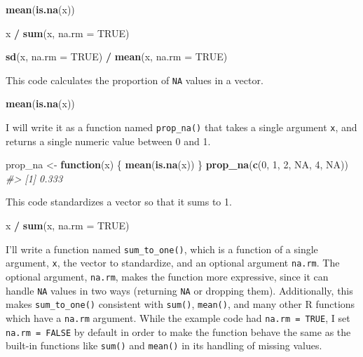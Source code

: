 \documentclass[]{book}
\newenvironment{Shaded}{\begin{snugshade}}{\end{snugshade}}
\newcommand{\CommentTok}[1]{\textcolor[rgb]{0.56,0.35,0.01}{\textit{#1}}}
\newcommand{\ControlFlowTok}[1]{\textcolor[rgb]{0.13,0.29,0.53}{\textbf{#1}}}
\newcommand{\DataTypeTok}[1]{\textcolor[rgb]{0.13,0.29,0.53}{#1}}
\newcommand{\DecValTok}[1]{\textcolor[rgb]{0.00,0.00,0.81}{#1}}
\newcommand{\KeywordTok}[1]{\textcolor[rgb]{0.13,0.29,0.53}{\textbf{#1}}}
\newcommand{\NormalTok}[1]{#1}
\newcommand{\OperatorTok}[1]{\textcolor[rgb]{0.81,0.36,0.00}{\textbf{#1}}}
\newcommand{\OtherTok}[1]{\textcolor[rgb]{0.56,0.35,0.01}{#1}}
\newcommand{\StringTok}[1]{\textcolor[rgb]{0.31,0.60,0.02}{#1}}
\theoremstyle{plain}
\theoremstyle{remark}
\begin{document}
\begin{Shaded}
\begin{Highlighting}[]
\KeywordTok{mean}\NormalTok{(}\KeywordTok{is.na}\NormalTok{(x))}

\NormalTok{x }\OperatorTok{/}\StringTok{ }\KeywordTok{sum}\NormalTok{(x, }\DataTypeTok{na.rm =} \OtherTok{TRUE}\NormalTok{)}

\KeywordTok{sd}\NormalTok{(x, }\DataTypeTok{na.rm =} \OtherTok{TRUE}\NormalTok{) }\OperatorTok{/}\StringTok{ }\KeywordTok{mean}\NormalTok{(x, }\DataTypeTok{na.rm =} \OtherTok{TRUE}\NormalTok{)}
\end{Highlighting}
\end{Shaded}

This code calculates the proportion of \texttt{NA} values in a vector.

\begin{Shaded}
\begin{Highlighting}[]
\KeywordTok{mean}\NormalTok{(}\KeywordTok{is.na}\NormalTok{(x))}
\end{Highlighting}
\end{Shaded}

I will write it as a function named \texttt{prop\_na()} that takes a single argument \texttt{x},
and returns a single numeric value between 0 and 1.

\begin{Shaded}
\begin{Highlighting}[]
\NormalTok{prop_na <-}\StringTok{ }\ControlFlowTok{function}\NormalTok{(x) \{}
  \KeywordTok{mean}\NormalTok{(}\KeywordTok{is.na}\NormalTok{(x))}
\NormalTok{\}}
\KeywordTok{prop_na}\NormalTok{(}\KeywordTok{c}\NormalTok{(}\DecValTok{0}\NormalTok{, }\DecValTok{1}\NormalTok{, }\DecValTok{2}\NormalTok{, }\OtherTok{NA}\NormalTok{, }\DecValTok{4}\NormalTok{, }\OtherTok{NA}\NormalTok{))}
\CommentTok{#> [1] 0.333}
\end{Highlighting}
\end{Shaded}

This code standardizes a vector so that it sums to 1.

\begin{Shaded}
\begin{Highlighting}[]
\NormalTok{x }\OperatorTok{/}\StringTok{ }\KeywordTok{sum}\NormalTok{(x, }\DataTypeTok{na.rm =} \OtherTok{TRUE}\NormalTok{)}
\end{Highlighting}
\end{Shaded}

I'll write a function named \texttt{sum\_to\_one()}, which is a function of a single argument, \texttt{x}, the vector to standardize, and an optional argument \texttt{na.rm}.
The optional argument, \texttt{na.rm}, makes the function more expressive, since it can
handle \texttt{NA} values in two ways (returning \texttt{NA} or dropping them).
Additionally, this makes \texttt{sum\_to\_one()} consistent with \texttt{sum()}, \texttt{mean()}, and many
other R functions which have a \texttt{na.rm} argument.
While the example code had \texttt{na.rm\ =\ TRUE}, I set \texttt{na.rm\ =\ FALSE} by default
in order to make the function behave the same as the built-in functions like \texttt{sum()} and \texttt{mean()} in its handling of missing values.
\end{document}
